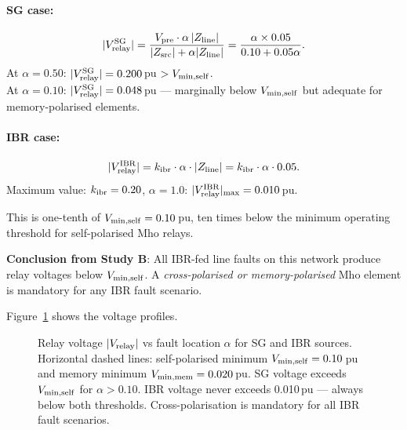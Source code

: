 \documentclass[11pt,a4paper]{article}
\begin{document}
\paragraph{SG case:}
\begin{equation}
  |V_{\rm relay}^{\rm SG}|
  = \frac{V_{\rm pre}\cdot\alpha\,|Z_{\rm line}|}{|Z_{\rm src}| + \alpha|Z_{\rm line}|}
  = \frac{\alpha \times 0.05}{0.10 + 0.05\alpha}.
  \label{eq:vrel_sg}
\end{equation}
At $\alpha = 0.50$: $|V_{\rm relay}^{\rm SG}| = 0.200$\,pu $>V_{\rm min,self}$. \\
At $\alpha = 0.10$: $|V_{\rm relay}^{\rm SG}| = 0.048$\,pu — marginally below
$V_{\rm min,self}$ but adequate for memory-polarised elements.

\paragraph{IBR case:}
\begin{equation}
  |V_{\rm relay}^{\rm IBR}| = k_{\rm ibr}\cdot\alpha\cdot|Z_{\rm line}|
                             = k_{\rm ibr}\cdot\alpha\cdot 0.05.
  \label{eq:vrel_ibr}
\end{equation}
Maximum value: $k_{\rm ibr} = 0.20$, $\alpha = 1.0$:
$|V_{\rm relay}^{\rm IBR}|_{\rm max} = 0.010$\,pu.

This is one-tenth of $V_{\rm min,self} = 0.10$\,pu, ten times below the
minimum operating threshold for self-polarised Mho relays.

\textbf{Conclusion from Study B}: All IBR-fed line faults on this
network produce relay voltages below $V_{\rm min,self}$.  A
\emph{cross-polarised or memory-polarised} Mho element is mandatory
for any IBR fault scenario.

Figure~\ref{fig:voltage} shows the voltage profiles.

\begin{figure}[h!]
  \centering
  
  \caption{Relay voltage $|V_{\rm relay}|$ vs fault location $\alpha$ for
           SG and IBR sources.  Horizontal dashed lines: self-polarised
           minimum $V_{\rm min,self} = 0.10$\,pu and memory minimum
           $V_{\rm min,mem} = 0.020$\,pu.
           SG voltage exceeds $V_{\rm min,self}$ for $\alpha > 0.10$.
           IBR voltage never exceeds 0.010\,pu — always below both thresholds.
           Cross-polarisation is mandatory for all IBR fault scenarios.}
  \label{fig:voltage}
\end{figure}
\end{document}
